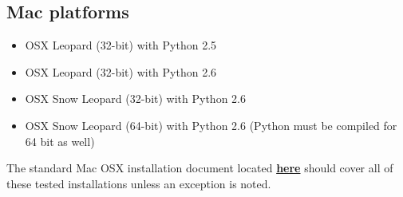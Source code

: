 \documentclass[12pt]{article}
\begin{document}
\subsection*{Mac platforms}

\begin{itemize}

\item OSX Leopard (32-bit) with Python 2.5
\item OSX Leopard (32-bit) with Python 2.6
\item OSX Snow Leopard (32-bit) with Python 2.6
\item OSX Snow Leopard (64-bit) with Python 2.6 (Python must be compiled for 64 bit as well)

\end{itemize}

The standard Mac OSX installation document located \href{../installation-osx/installation-osx.tex}{\bf here}
 should cover all of these tested installations unless an exception is noted.
\end{document}
